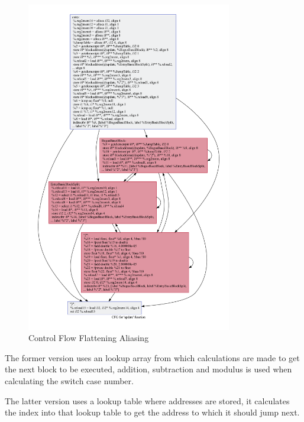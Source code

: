 \begin{figure}[t]
  \includegraphics[width=0.8\textwidth]{./images/update_alias.pdf}
  \caption{Control Flow Flattening Aliasing}
\end{figure}

The former version uses an lookup array from which calculations are made to get the next block to be executed, addition,
subtraction and modulus is used when calculating the switch case number.

The latter version uses a lookup table where addresses are stored, it calculates the index into that lookup table to get the address to which it should jump
next.